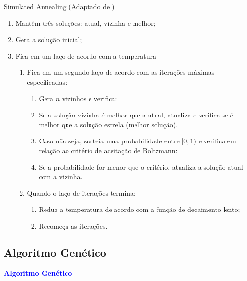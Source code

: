 \documentclass[compress, hide notes]{beamer}
\let\olditem=\item%
\renewcommand{\item}{\olditem \justifying}%
\begin{document}
 \begin{frame}{Simulated Annealing (Adaptado de \cite{Lopes2013})}
 
 \begin{enumerate}
 \item Mantêm três soluções: atual, vizinha e melhor;
 
 \bigskip
 
 \item Gera a solução inicial;
 
 \bigskip
 
 \item Fica em um laço de acordo com a temperatura: 
 \begin{enumerate}
 \item Fica em um segundo laço de acordo com as iterações máximas especificadas:
 \begin{enumerate}
 \item Gera $n$ vizinhos e verifica:
 \item Se a solução vizinha é melhor que a atual, atualiza e verifica se é melhor que a solução estrela (melhor solução).
 \item Caso não seja, sorteia uma probabilidade entre $[0,1)$ e verifica em relação ao critério de aceitação de Boltzmann:
 \item Se a probabilidade for menor que o critério, atualiza a solução atual com a vizinha.
 \end{enumerate}
 
 \bigskip
 
 \item Quando o laço de iterações termina:
 \begin{enumerate}
 \item Reduz a temperatura de acordo com a função de decaimento lento;
 \item Recomeça as iterações.
 \end{enumerate}
 \end{enumerate}
 \end{enumerate}
 
 \end{frame}
 
 

		\subsection{Algoritmo Genético}
			\begin{frame}
				\centering
				{
					\Huge 
					\textcolor{blue}{\textbf{Algoritmo Genético}}
				}
			\end{frame}
\end{document}

